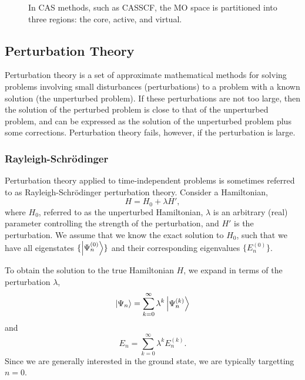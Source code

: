 \begin{figure}[htbp]
    \centering

    \caption{In \gls{CAS} methods, such as \gls{CASSCF}, the \gls{MO} space is partitioned into three regions: the core, active, and virtual.\todo{}}
    \label{fig:cas}
\end{figure}

\subsection{Perturbation Theory}
\label{sec:perturbation-theory}

Perturbation theory is a set of approximate mathematical methods for solving problems involving small disturbances (perturbations) to a problem with a known solution (the unperturbed problem). If these perturbations are not too large, then the solution of the perturbed problem is close to that of the unperturbed problem, and can be expressed as the solution of the unperturbed problem plus some corrections. Perturbation theory fails, however, if the perturbation is large.

\subsubsection{Rayleigh-Schr\"odinger}

Perturbation theory applied to time-independent problems is sometimes referred to as Rayleigh-Schr\"odinger perturbation theory.\cite{sakuraiModern2017} Consider a Hamiltonian,
\begin{equation}
H = H_0 + \lambda H',
\end{equation}
where $H_0$, referred to as the unperturbed Hamiltonian, $\lambda$ is an arbitrary (real) parameter controlling the strength of the perturbation, and $H'$ is the perturbation. We assume that we know the exact solution to $H_0$, such that we have all eigenstates $\{\ket{\Psi_n^{(0)}}\}$ and their corresponding eigenvalues $\{E_n^{(0)} \}$.

To obtain the solution to the true Hamiltonian $H$, we expand in terms of the perturbation $\lambda$,
\begin{equation}
\ket{\Psi_n} = \sum_{k=0}^\infty \lambda^k\ket{\Psi_n^{(k)}}
\end{equation}
and
\begin{equation}
E_n = \sum_{k=0}^\infty \lambda^kE_n^{(k)}.
\end{equation}
Since we are generally interested in the ground state, we are typically targetting $n=0$.

